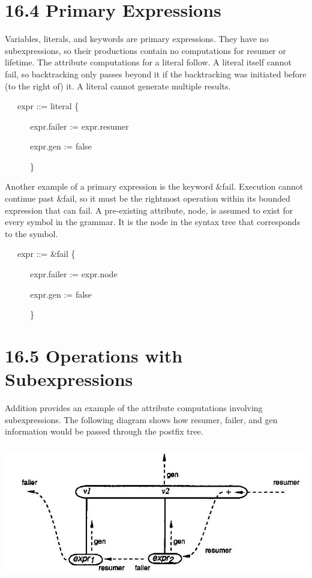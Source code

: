 \section[16.4 Primary Expressions]{16.4 Primary Expressions}

Variables, literals, and keywords are primary expressions. They have
no subexpressions, so their productions contain no computations for
resumer or lifetime. The attribute computations for a literal
follow. A literal itself cannot fail, so backtracking only passes
beyond it if the backtracking was initiated before (to the right of)
it. A literal cannot generate multiple results.

{\ttfamily\mdseries
\ \ \ expr ::= literal \{}

{\ttfamily\mdseries
\ \ \ \ \ \ expr.failer := expr.resumer}

{\ttfamily\mdseries
\ \ \ \ \ \ expr.gen := false}

{\ttfamily\mdseries
\ \ \ \ \ \ \}}


Another example of a primary expression is the keyword
\&fail. Execution cannot continue past \&fail, so it must be the
rightmost operation within its bounded expression that can fail. A
pre-existing attribute, node, is assumed to exist for every symbol in
the grammar. It is the node in the syntax tree that corresponds to the
symbol.

{\ttfamily\mdseries
\ \ \ expr ::= \&fail \{}

{\ttfamily\mdseries
\ \ \ \ \ \ expr.failer := expr.node}

{\ttfamily\mdseries
\ \ \ \ \ \ expr.gen := false}

{\ttfamily\mdseries
\ \ \ \ \ \ \}}


\section[16.5 Operations with Subexpressions]{16.5 Operations with Subexpressions}

Addition provides an example of the attribute computations involving
subexpressions. The following diagram shows how resumer, failer, and
gen information would be passed through the postfix tree.

\noindent\includegraphics[width=5.9in,height=2.3in]{kw/figure4-5.png}

